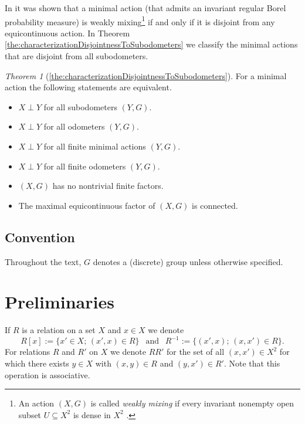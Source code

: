 \documentclass[12pt, reqno]{amsart}
\theoremstyle{definition}
\theoremstyle{remark}
\numberwithin{equation}{section}
\theoremstyle{theorem}
\newtheorem*{theorem*}{Theorem}
\theoremstyle{remark}
\begin{document}
In \cite[Chapter 11]{auslander1988minimal} it was shown that a minimal action (that admits an invariant regular Borel probability measure) is weakly mixing\footnote{
    An action $(X,G)$ is called \emph{weakly mixing} if every invariant nonempty open subset $U\subseteq X^2$ is dense in $X^2$ \cite{auslander1988minimal}. 
}
if and only if it is disjoint from any equicontinuous action. 
In Theorem \ref{the:characterizationDisjointnessToSubodometers} we classify the minimal actions that are disjoint from all subodometers. 

\begin{theorem*}[\ref{the:characterizationDisjointnessToSubodometers}]
    For a minimal action the following statements are equivalent. 
    \begin{itemize}
        \item[(i)] $X\perp Y$ for all subodometers $(Y,G)$. 
        \item[(ii)] $X\perp Y$ for all odometers $(Y,G)$.
        \item[(iii)] $X\perp Y$ for all finite minimal actions $(Y,G)$. 
        \item[(iv)] $X\perp Y$ for all finite odometers $(Y,G)$.
        \item[(v)] $(X,G)$ has no nontrivial finite factors. 
        \item[(vi)] The maximal equicontinuous factor of $(X,G)$ is connected. 
    \end{itemize}
\end{theorem*}



\subsection*{Convention}
    Throughout the text, $G$ denotes a (discrete) group unless otherwise specified.









    





\section{Preliminaries}
\label{sec:prelims}

If $R$ is a relation on a set $X$ and $x\in X$ we denote \[R[x]:=\{x'\in X;\, (x',x)\in R\} 
~~\text{ and }~~ R^{-1}:=\{(x',x);\, (x,x')\in R\}.\] 
For relations $R$ and $R'$ on $X$ we denote $RR'$ for the set of all $(x,x')\in X^2$ for which there exists $y\in X$ with $(x,y)\in R$ and $(y,x')\in R'$. Note that this operation is associative. 
\end{document}
